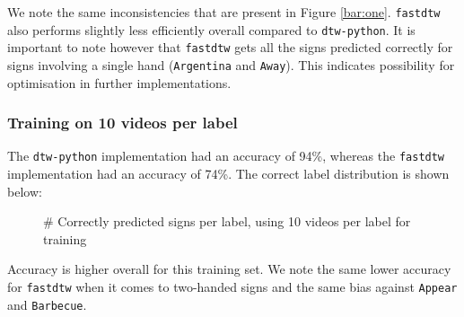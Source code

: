 \documentclass[final,rdr32.tex]{subfiles}
\begin{document}
We note the same inconsistencies that are present in Figure \ref{bar:one}. \verb|fastdtw| also performs slightly less efficiently overall compared to \verb|dtw-python|. It is important to note however that \verb|fastdtw| gets all the signs predicted correctly for signs involving a single hand (\verb|Argentina| and \verb|Away|). This indicates possibility for optimisation in further implementations.


\subsubsection{Training on 10 videos per label}
\label{sec:tenvid}

The \verb|dtw-python| implementation had an accuracy of 94\%, whereas the \verb|fastdtw| implementation had an accuracy of 74\%. The correct label distribution is shown below:

\begin{figure}[H]
    \begin{center}
    \end{center}
    \caption{\# Correctly predicted signs per label, using 10 videos per label for training}
    \label{bar:three}
\end{figure}

Accuracy is higher overall for this training set. We note the same lower accuracy for \verb|fastdtw| when it comes to two-handed signs and the same bias against \verb|Appear| and \verb|Barbecue|.
\end{document}

